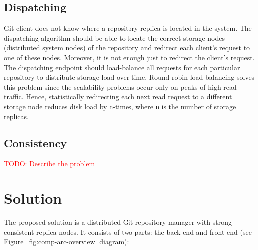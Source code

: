 \documentclass[acmlarge, screen, nonacm, 11pt]{acmart}
\newcommand{\code}[1]{\texttt{#1}}
\newcommand{\todo}[1]{\textcolor{red}{TODO: #1}}
\begin{document}
\subsection{Dispatching}\label{sec:dispatching}

Git client does not know where a repository replica is located in the system. The dispatching algorithm
should be able to locate the correct storage nodes (distributed system nodes) of the repository and redirect
each client's request to one of these nodes. Moreover, it is not enough just to redirect the client's request.
The dispatching endpoint should load-balance all requests for each particular repository to distribute
storage load over time. Round-robin load-balancing solves this problem since the scalability problems
occur only on peaks of high read traffic. Hence, statistically redirecting each next read request to
a different storage node reduces disk load by \code{n}-times, where \code{n} is the number of storage replicas.

\subsection{Consistency}

\todo{Describe the problem}


\section{Solution}\label{sec:solution}

The proposed solution is a distributed Git repository manager with strong
consistent replica nodes.
It consists of two parts: the back-end and front-end
(see Figure~\ref{fig:comp-arc-overview} diagram):
\end{document}
